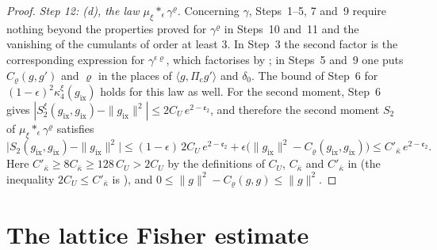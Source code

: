 \documentclass[11pt]{amsart}
\theoremstyle{definition}
\begin{document}
\begin{proof}
\emph{Step 12: (d), the law $\mu_\xi\ast_\epsilon\gamma^\varrho$.}
Concerning $\gamma$, Steps~1--5, 7 and~9 require nothing beyond the properties proved for $\gamma^\varrho$ in Steps~10 and~11 and the vanishing of the cumulants of order at least $3$.
In Step~3 the second factor is the corresponding expression for $\gamma^{\epsilon\varrho}$, which factorises by \cite[Lemma~9.11\,(c)]{QEDI}; in Steps~5 and~9 one puts $C_\varrho(g,g')$ and $\varrho$ in the places of $\langle g,\Pi_{\mathrm c}g'\rangle$ and $\delta_0$.
The bound of Step~6 for $(1-\epsilon)^2\kappa_4^\xi(g_{\mathrm{ix}})$ holds for this law as well.
For the second moment, Step~6 gives $|S_2^\xi(g_{\mathrm{ix}},\allowbreak g_{\mathrm{ix}})-\|g_{\mathrm{ix}}\|^2|\le2C_U\,\allowbreak e^{2-\mathfrak e_2}$, and therefore the second moment $S_2$ of $\mu_\xi\ast_\epsilon\gamma^\varrho$ satisfies
\begin{equation*}
\bigl|S_2(g_{\mathrm{ix}},g_{\mathrm{ix}})-\|g_{\mathrm{ix}}\|^2\bigr|\le(1-\epsilon)\,2C_U\,e^{2-\mathfrak e_2}+\epsilon\bigl(\|g_{\mathrm{ix}}\|^2-C_\varrho(g_{\mathrm{ix}},g_{\mathrm{ix}})\bigr)\le C'_{\bar\kappa}\,e^{2-\mathfrak e_2}.
\end{equation*}
Here $C'_{\bar\kappa}\ge8C_{\bar\kappa}\ge128\,C_U>2C_U$ by the definitions of $C_U$, $C_{\bar\kappa}$ and $C'_{\bar\kappa}$ in \cite[Proposition~43.2, Constants]{QEDIII} (the inequality $2C_U\le C'_{\bar\kappa}$ is \cite[Chapter~44, (0.2)]{QEDIII}), and $0\le\|g\|^2-C_\varrho(g,g)\le\|g\|^2$.
\end{proof}


\section{The lattice Fisher estimate}
\end{document}
